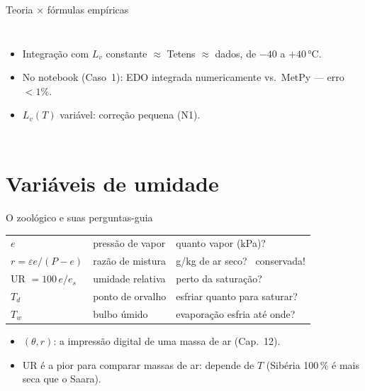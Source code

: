 \documentclass[aspectratio=169,11pt]{beamer}
\begin{document}
\begin{frame}{Teoria × fórmulas empíricas}
  \begin{columns}
    \begin{itemize}
      \item Integração com $L_v$ constante $\approx$ Tetens $\approx$
            dados, de $-40$ a $+40\,°$C.
      \item No notebook (Caso~1): EDO integrada numericamente vs.\
            MetPy — erro $<1\%$.
      \item $L_v(T)$ variável: correção pequena (N1).
    \end{itemize}
  \end{columns}
\end{frame}

\section{Variáveis de umidade}

\begin{frame}{O zoológico e suas perguntas-guia}
  \centering
  \begin{tabular}{lll}
    \hline
    $e$ & pressão de vapor & quanto vapor (kPa)? \\
    $r = \varepsilon e/(P-e)$ & razão de mistura & g/kg de ar seco?
    \ \alert{conservada!} \\
    UR $= 100\,e/e_s$ & umidade relativa & perto da saturação? \\
    $T_d$ & ponto de orvalho & esfriar quanto para saturar? \\
    $T_w$ & bulbo úmido & evaporação esfria até onde? \\
    \hline
  \end{tabular}
  \vspace{0.6em}
  \begin{itemize}
    \item $(\theta, r)$: a impressão digital de uma massa de ar
          (Cap.~12).
    \item UR é a \alert{pior} para comparar massas de ar: depende de $T$
          (Sibéria 100\,\% é mais seca que o Saara).
  \end{itemize}
\end{frame}
\end{document}
